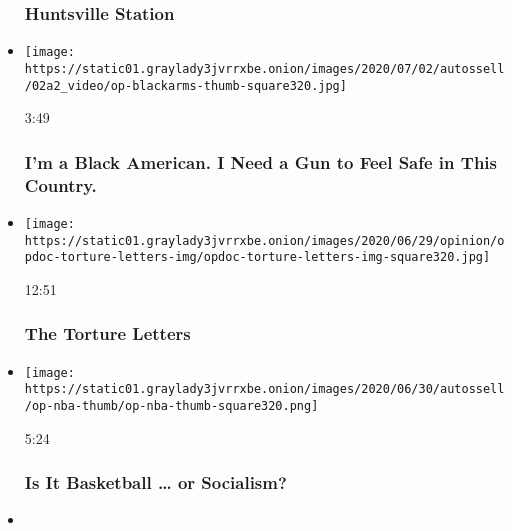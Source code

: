 \begin{itemize}
  \hypertarget{huntsville-station}{%
  \subsubsection{Huntsville Station}\label{huntsville-station}}
\item
  \href{https://www.nytimes3xbfgragh.onion/video/embedded/opinion/100000007209565/black-gun-ownership.html?action=click\&module=video-series-bar\&region=header\&pgtype=Article\&playlistId=video/opinion}{}

  \texttt{[image: https://static01.graylady3jvrrxbe.onion/images/2020/07/02/autossell/02a2\_video/op-blackarms-thumb-square320.jpg]}

  3:49

  \hypertarget{im-a-black-american-i-need-a-gun-to-feel-safe-in-this-country}{%
  \subsubsection{I'm a Black American. I Need a Gun to Feel Safe in This
  Country.}\label{im-a-black-american-i-need-a-gun-to-feel-safe-in-this-country}}
\item
  \href{https://www.nytimes3xbfgragh.onion/video/opinion/100000007205588/the-torture-letters.html?action=click\&module=video-series-bar\&region=header\&pgtype=Article\&playlistId=video/opinion}{}

  \texttt{[image: https://static01.graylady3jvrrxbe.onion/images/2020/06/29/opinion/opdoc-torture-letters-img/opdoc-torture-letters-img-square320.jpg]}

  12:51

  \hypertarget{the-torture-letters}{%
  \subsubsection{The Torture Letters}\label{the-torture-letters}}
\item
  \href{https://www.nytimes3xbfgragh.onion/video/opinion/100000007182805/income-inequality-nba-socialism.html?action=click\&module=video-series-bar\&region=header\&pgtype=Article\&playlistId=video/opinion}{}

  \texttt{[image: https://static01.graylady3jvrrxbe.onion/images/2020/06/30/autossell/op-nba-thumb/op-nba-thumb-square320.png]}

  5:24

  \hypertarget{is-it-basketball--or-socialism}{%
  \subsubsection{Is It Basketball \ldots{} or
  Socialism?}\label{is-it-basketball--or-socialism}}
\item
  \href{https://www.nytimes3xbfgragh.onion/video/opinion/100000007105817/coronavirus-texas-hospital.html?action=click\&module=video-series-bar\&region=header\&pgtype=Article\&playlistId=video/opinion}{}


\end{itemize}
